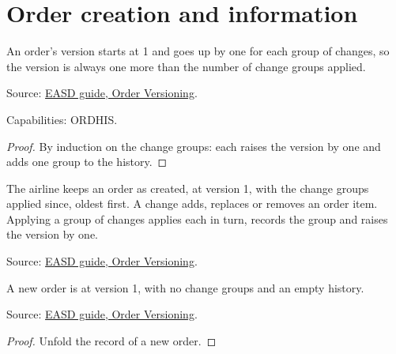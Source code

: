 
\section{Order creation and information}

\begin{theorem}
  \label{thm:c21-version}
  An order's version starts at 1 and goes up by one for each group of changes,
  so the version is always one more than the number of change groups applied.

  Source: \href{https://standards.atlassian.net/wiki/spaces/EASD/pages/574259659/Order+Versioning}{EASD guide, Order Versioning}.

  Capabilities: ORDHIS.
\end{theorem}
\begin{proof}
  By induction on the change groups: each raises the version by one and adds
  one group to the history.
\end{proof}

\begin{definition}
  \label{def:order-creation-record-changes}
  The airline keeps an order as created, at version 1, with the change groups
  applied since, oldest first.  A change adds, replaces or removes an order
  item.  Applying a group of changes applies each in turn, records the group
  and raises the version by one.

  Source: \href{https://standards.atlassian.net/wiki/spaces/EASD/pages/574259659/Order+Versioning}{EASD guide, Order Versioning}.
\end{definition}

\begin{theorem}
  \label{thm:order-creation-created-version-one}
  A new order is at version 1, with no change groups and an empty history.

  Source: \href{https://standards.atlassian.net/wiki/spaces/EASD/pages/574259659/Order+Versioning}{EASD guide, Order Versioning}.
\end{theorem}
\begin{proof}
  Unfold the record of a new order.
\end{proof}

